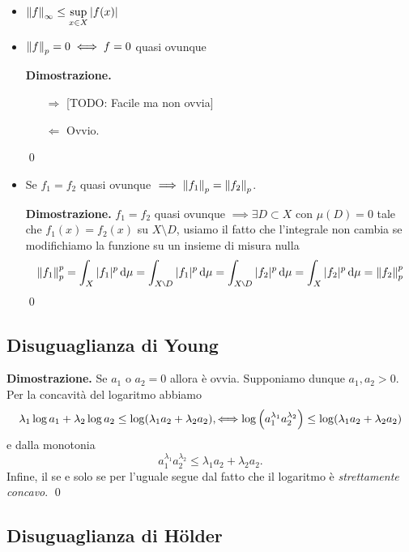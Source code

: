 \begin{itemize}
	\item $\displaystyle \left\lVert f \right\rVert_\infty \leq \sup_{x \in X} |f(x)|$

	\item $\left\lVert f \right\rVert_p = 0 \iff f = 0$ quasi ovunque

		\textbf{Dimostrazione.}
		\begin{itemize}
			\item[$\boxed{\Rightarrow}$] [TODO: Facile ma non ovvia]
			\item[$\boxed{\Leftarrow}$] Ovvio.
		\end{itemize}
		\qed

	\item Se $f_1 = f_2$ quasi ovunque $\implies \left\lVert f_1 \right\rVert_p = \left\lVert f_2 \right\rVert_p$.

		\textbf{Dimostrazione.} 
		$f_1 = f_2$ quasi ovunque $\implies \exists D \subset X$ con $\mu(D) = 0$ tale che $f_1(x) = f_2(x)$ su $X \setminus D$, usiamo il fatto che l'integrale non cambia se modifichiamo la funzione su un insieme di misura nulla
		$$
		\norm{f_1}_p^p
		= \int_X |f_1|^p \dd \mu 
		= \int_{X \setminus D} |f_1|^p \dd \mu 
		= \int_{X \setminus D} |f_2|^p \dd \mu 
		= \int_{X} |f_2|^p \dd \mu 
		= \norm{f_2}_p^p
		$$ 
		\qed
\end{itemize}

\subsection{Disuguaglianza di Young}


\textbf{Dimostrazione.}
Se $a_1$ o $a_2 = 0$ allora è ovvia. Supponiamo dunque $a_1, a_2 > 0$. Per la concavità del logaritmo abbiamo
$$
	\lambda_1 \log a_1 + \lambda_2 \log a_2 \leq \log(\lambda_1 a_2 + \lambda_2 a_2),
	\Longleftrightarrow \log \left( a_1^{\lambda_1} a_2^{\lambda_2} \right) \leq \log(\lambda_1 a_2 + \lambda_2 a_2)
$$
e dalla monotonia
%
$$
	 a_1^{\lambda_1} a_2^{\lambda_2} \leq \lambda_1 a_2 + \lambda_2 a_2.
$$
%
Infine, il se e solo se per l'uguale segue dal fatto che il logaritmo è \textit{strettamente concavo}. 
\qed

\subsection{Disuguaglianza di H\"older}

